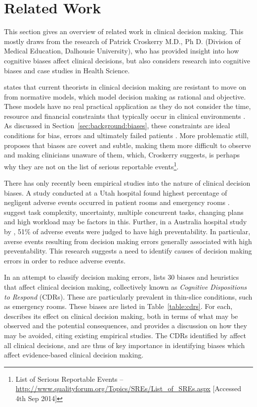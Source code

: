 \documentclass[a4paper]{scrartcl}     %
\newif\ifbreaksection
\begin{document}
\ifbreaksection\clearpage\fi\section{Related Work}\label{sec:related} %

  This section gives an overview of related work in clinical decision making. This mostly draws from the research of Patrick Croskerry M.D., Ph D. (Division of Medical Education, Dalhousie University), who has provided insight into how cognitive biases affect clinical decisions, but also considers research into cognitive biases and case studies in Health Science.

  \citet{Croskerry2003} states that current theorists in clinical decision making are resistant to move on from normative models, which model decision making as rational and objective.  These models have no real practical application as they do not consider the time, resource and financial constraints that typically occur in clinical environments \citep{Croskerry2003}. As discussed in Section~\ref{sec:background:biases}, these constraints are ideal conditions for bias, errors and ultimately failed patients \citep{Kahneman2012}. More problematic still, \citet{Croskerry2003a} proposes that biases are covert and subtle, making them more difficult to observe and making clinicians unaware of them, which, Croskerry suggests, is perhaps why they are not on the list of serious reportable events\footnote{List of Serious Reportable Events -- \url{http://www.qualityforum.org/Topics/SREs/List_of_SREs.aspx} [Accessed 4th Sep 2014]}.

  There has only recently been empirical studies into the nature of clinical decision biases. A study conducted at a Utah hospital found highest percentage of negligent adverse events occurred in patient rooms and emergency rooms \citep{Thomas2000}. \citeauthor{Thomas2000} suggest task complexity, uncertainty, multiple concurrent tasks, changing plans and high workload may be factors in this. Further, in a Australia hospital study by \citet{Wilson1995}, 51\% of adverse events were judged to have high preventability. In particular, averse events resulting from decision making errors generally associated with high preventability. This research suggests a need to identify causes of decision making errors in order to reduce adverse events.

  In an attempt to classify decision making errors, \citet{Croskerry2002} lists 30 biases and heuristics that affect clinical decision making, collectively known as \textit{Cognitive Dispositions to Respond} (CDRs). These are particularly prevalent in thin-slice conditions, such as emergency rooms. These biases are listed in Table~\ref{table:cdrs}. For each, \citeauthor{Croskerry2002} describes its effect on clinical decision making, both in terms of what may be observed and the potential consequences, and provides a discussion on how they may be avoided, citing existing empirical studies. The CDRs identified by \citet{Croskerry2002} affect all clinical decisions, and are thus of key importance in identifying biases which affect evidence-based clinical decision making.
\end{document}
